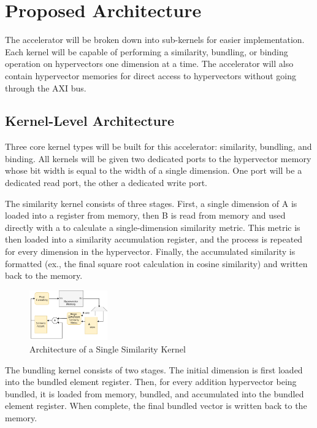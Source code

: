 \documentclass[conference]{IEEEtran}
\begin{document}
\section{Proposed Architecture}

The accelerator will be broken down into sub-kernels for easier implementation. Each kernel will be capable of performing a similarity, bundling, or binding operation on hypervectors one dimension at a time. The accelerator will also contain hypervector memories for direct access to hypervectors without going through the AXI bus.

\subsection{Kernel-Level Architecture}

Three core kernel types will be built for this accelerator: similarity, bundling, and binding. All kernels will be given two dedicated ports to the hypervector memory whose bit width is equal to the width of a single dimension. One port will be a dedicated read port, the other a dedicated write port. 

The similarity kernel consists of three stages. First, a single dimension of A is loaded into a register from memory, then B is read from memory and used directly with a to calculate a single-dimension similarity metric. This metric is then loaded into a similarity accumulation register, and the process is repeated for every dimension in the hypervector. Finally, the accumulated similarity is formatted (ex., the final square root calculation in cosine similarity) and written back to the memory.

\begin{figure}[H]
    \centering
    \includegraphics[width=0.3\textwidth]{img/kernel-similarity.png}
    \caption{Architecture of a Single Similarity Kernel}
    \label{fig:sim-kernel}
\end{figure}

The bundling kernel consists of two stages. The initial dimension is first loaded into the bundled element register. Then, for every addition hypervector being bundled, it is loaded from memory, bundled, and accumulated into the bundled element register. When complete, the final bundled vector is written back to the memory.
\end{document}

